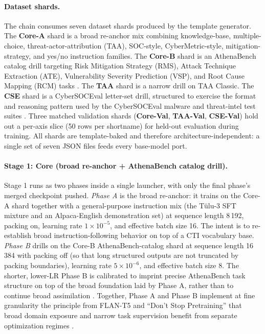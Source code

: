 \documentclass[webpdf,contemporary,large]{oup-authoring-template}
\theoremstyle{thmstyleone}
\theoremstyle{thmstyletwo}
\theoremstyle{thmstylethree}
\begin{document}
\paragraph{Dataset shards.}
The chain consumes seven dataset shards produced by the template generator. The \textbf{Core-A} shard is a broad re-anchor mix combining knowledge-base, multiple-choice, threat-actor-attribution (TAA), SOC-style, CyberMetric-style, mitigation-strategy, and yes/no instruction families. The \textbf{Core-B} shard is an AthenaBench catalog drill targeting Risk Mitigation Strategy (RMS), Attack Technique Extraction (ATE), Vulnerability Severity Prediction (VSP), and Root Cause Mapping (RCM) tasks \cite{alam2025athenabench}. The \textbf{TAA} shard is a narrow drill on TAA Classic. The \textbf{CSE} shard is a CyberSOCEval letter-set drill, structured to exercise the format and reasoning pattern used by the CyberSOCEval malware and threat-intel test suites \cite{cybersoceval2025}. Three matched validation shards (\textbf{Core-Val}, \textbf{TAA-Val}, \textbf{CSE-Val}) hold out a per-axis slice (50 rows per shortname) for held-out evaluation during training. All shards are template-baked and therefore architecture-independent: a single set of seven JSON files feeds every base-model port.

\paragraph{Stage 1: Core (broad re-anchor + AthenaBench catalog drill).}
Stage 1 runs as two phases inside a single launcher, with only the final phase's merged checkpoint pushed. \emph{Phase A} is the broad re-anchor: it trains on the Core-A shard together with a general-purpose instruction mix (the Tülu-3 SFT mixture and an Alpaca-English demonstration set) at sequence length 8\,192, packing on, learning rate $1 \times 10^{-5}$, and effective batch size 16. The intent is to re-establish broad instruction-following behavior on top of a CTI vocabulary base. \emph{Phase B} drills on the Core-B AthenaBench-catalog shard at sequence length 16\,384 with packing off (so that long structured outputs are not truncated by packing boundaries), learning rate $5 \times 10^{-6}$, and effective batch size 8. The shorter, lower-LR Phase B is calibrated to imprint precise AthenaBench task structure on top of the broad foundation laid by Phase A, rather than to continue broad assimilation \cite{alam2025athenabench}. Together, Phase A and Phase B implement at fine granularity the principle from FLAN-T5 and ``Don't Stop Pretraining'' that broad domain exposure and narrow task supervision benefit from separate optimization regimes \cite{chung2022flant5,gururangan2020dontstop}.
\end{document}
